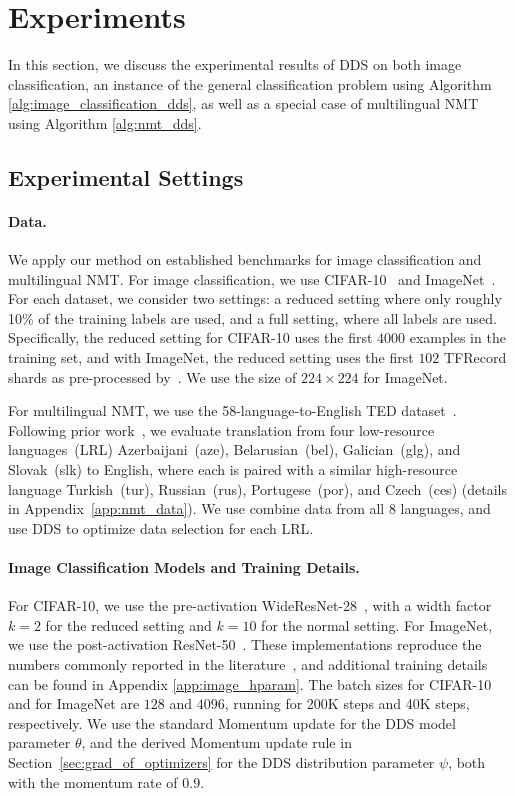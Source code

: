 \section{\label{sec:experiment}Experiments}
In this section, we discuss the experimental results of DDS on both image classification, an instance of the general classification problem using Algorithm \ref{alg:image_classification_dds}, as well as a special case of multilingual NMT using Algorithm \ref{alg:nmt_dds}.

\subsection{\label{exp:settings}Experimental Settings}

\paragraph{Data.} We apply our method on established benchmarks for image classification and multilingual NMT.
For image classification, we use CIFAR-10~\citep{cifar10} and ImageNet~\citep{imagenet}. For each dataset, we consider two settings: a reduced setting where only roughly 10\% of the training labels are used, and a full setting, where all labels are used. Specifically, the reduced setting for CIFAR-10 uses the first $4000$ examples in the training set, and with ImageNet, the reduced setting uses the first $102$ TFRecord shards as pre-processed by~\citet{imagenet_generalize_better}. We use the size of $224 \times 224$ for ImageNet.

For multilingual NMT, we use the 58-language-to-English TED dataset~\citep{ted_pretrain_emb}. 
Following prior work~\citep{ted_pretrain_emb,rapid_adapt_nmt,SDE}, we evaluate translation from four low-resource languages~(LRL) Azerbaijani~(aze), Belarusian~(bel), Galician~(glg), and Slovak~(slk) to English, where each is paired with a similar high-resource language Turkish~(tur), Russian~(rus), Portugese~(por), and Czech~(ces) (details in Appendix~\ref{app:nmt_data}).
We use combine data from all 8 languages, and use DDS to optimize data selection for each LRL. 

\paragraph{Image Classification Models and Training Details.}
For CIFAR-10, we use the pre-activation WideResNet-28~\citep{wide_res_net}, with a width factor $k=2$ for the reduced setting and $k=10$ for the normal setting. For ImageNet, we use the post-activation ResNet-50~\citep{res_net}.
These implementations reproduce the numbers commonly reported in the literature~\citep{wide_res_net,res_net,resnext}, and additional training details can be found in Appendix \ref{app:image_hparam}.
The batch sizes for CIFAR-10 and for ImageNet are $128$ and $4096$, running for 200K steps and 40K steps, respectively. We use the standard Momentum update for the DDS model parameter $\theta$, and the derived Momentum update rule in Section~\ref{sec:grad_of_optimizers} for the DDS distribution parameter $\psi$, both with the momentum rate of $0.9$.

